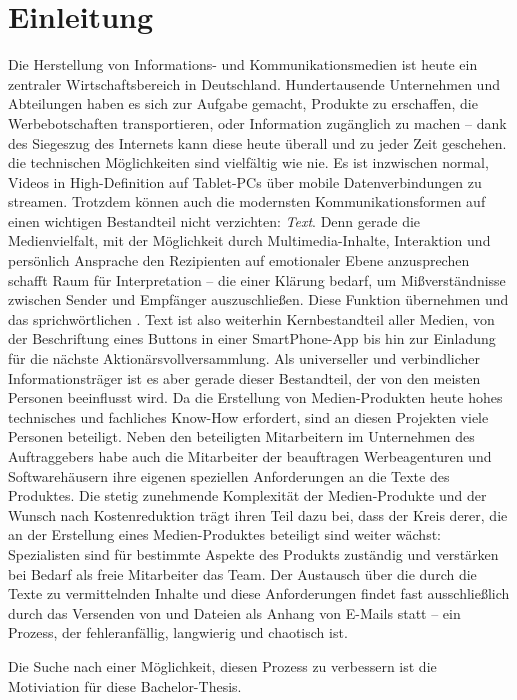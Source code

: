 \section{Einleitung}

Die Herstellung von Informations- und Kommunikationsmedien ist heute ein zentraler Wirtschaftsbereich in Deutschland. Hundertausende Unternehmen und Abteilungen haben es sich zur Aufgabe gemacht, Produkte zu erschaffen, die Werbebotschaften transportieren, oder Information zugänglich zu machen -- dank des Siegeszug des Internets kann diese heute überall und zu jeder Zeit geschehen. die technischen Möglichkeiten sind vielfältig wie nie. Es ist inzwischen normal, Videos in High-Definition auf Tablet-PCs über mobile Datenverbindungen zu streamen. Trotzdem können auch die modernsten Kommunikationsformen auf einen wichtigen Bestandteil nicht verzichten: \emph{Text}. Denn gerade die Medienvielfalt, mit der Möglichkeit durch Multimedia-Inhalte, Interaktion und persönlich Ansprache den Rezipienten auf emotionaler Ebene anzusprechen schafft Raum für Interpretation -- die einer Klärung bedarf, um Mißverständnisse zwischen Sender und Empfänger auszuschließen. Diese Funktion übernehmen  und das sprichwörtlichen . Text ist also weiterhin Kernbestandteil aller Medien, von der Beschriftung eines Buttons in einer SmartPhone-App bis hin zur Einladung für die nächste Aktionärsvollversammlung. Als universeller und verbindlicher Informationsträger ist es aber gerade dieser Bestandteil, der von den meisten Personen beeinflusst wird. Da die Erstellung von Medien-Produkten heute hohes technisches und fachliches Know-How erfordert, sind an diesen Projekten viele Personen beteiligt. Neben den beteiligten Mitarbeitern im Unternehmen des Auftraggebers habe auch die Mitarbeiter der beauftragen Werbeagenturen und Softwarehäusern ihre eigenen speziellen Anforderungen an die Texte des Produktes. Die stetig zunehmende Komplexität der Medien-Produkte und der Wunsch nach Kostenreduktion trägt ihren Teil dazu bei, dass der Kreis derer, die an der Erstellung eines Medien-Produktes beteiligt sind weiter wächst: Spezialisten sind für bestimmte Aspekte des Produkts zuständig und verstärken bei Bedarf als freie Mitarbeiter das Team. Der Austausch über die durch die Texte zu vermittelnden Inhalte und diese Anforderungen findet fast ausschließlich durch das Versenden von  und Dateien als Anhang von E-Mails statt -- ein Prozess, der fehleranfällig, langwierig und chaotisch ist. 

\bigskip

Die Suche nach einer Möglichkeit, diesen Prozess zu verbessern ist die Motiviation für diese Bachelor-Thesis. 

\pagebreak